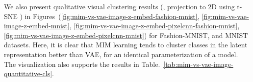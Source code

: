 We also present qualitative visual clustering results (\ie, projection to 2D using t-SNE \cite{maaten2008visualizing}) in Figures\ (\ref{fig:mim-vs-vae-image-z-embed-fashion-mnist}, \ref{fig:mim-vs-vae-image-z-embed-mnist}, \ref{fig:mim-vs-vae-image-z-embed-pixelcnn-fashion-mnist}, \ref{fig:mim-vs-vae-image-z-embed-pixelcnn-mnist}) for Fashion-MNIST, and MNIST datasets. 
Here, it is clear that MIM learning tends to cluster classes in the latent representation better than VAE, for an identical parameterization of a model. The visualization also supports the results in Table.\ \ref{tab:mim-vs-vae-image-quantitative-cls}.





